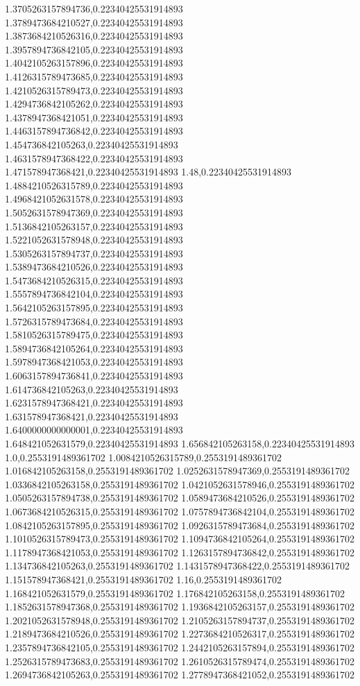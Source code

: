 1.3705263157894736,0.22340425531914893
1.3789473684210527,0.22340425531914893
1.3873684210526316,0.22340425531914893
1.3957894736842105,0.22340425531914893
1.4042105263157896,0.22340425531914893
1.4126315789473685,0.22340425531914893
1.4210526315789473,0.22340425531914893
1.4294736842105262,0.22340425531914893
1.4378947368421051,0.22340425531914893
1.4463157894736842,0.22340425531914893
1.454736842105263,0.22340425531914893
1.4631578947368422,0.22340425531914893
1.471578947368421,0.22340425531914893
1.48,0.22340425531914893
1.4884210526315789,0.22340425531914893
1.4968421052631578,0.22340425531914893
1.5052631578947369,0.22340425531914893
1.5136842105263157,0.22340425531914893
1.5221052631578948,0.22340425531914893
1.5305263157894737,0.22340425531914893
1.5389473684210526,0.22340425531914893
1.5473684210526315,0.22340425531914893
1.5557894736842104,0.22340425531914893
1.5642105263157895,0.22340425531914893
1.5726315789473684,0.22340425531914893
1.5810526315789475,0.22340425531914893
1.5894736842105264,0.22340425531914893
1.5978947368421053,0.22340425531914893
1.6063157894736841,0.22340425531914893
1.614736842105263,0.22340425531914893
1.6231578947368421,0.22340425531914893
1.631578947368421,0.22340425531914893
1.6400000000000001,0.22340425531914893
1.648421052631579,0.22340425531914893
1.656842105263158,0.22340425531914893
1.0,0.2553191489361702
1.0084210526315789,0.2553191489361702
1.016842105263158,0.2553191489361702
1.0252631578947369,0.2553191489361702
1.0336842105263158,0.2553191489361702
1.0421052631578946,0.2553191489361702
1.0505263157894738,0.2553191489361702
1.0589473684210526,0.2553191489361702
1.0673684210526315,0.2553191489361702
1.0757894736842104,0.2553191489361702
1.0842105263157895,0.2553191489361702
1.0926315789473684,0.2553191489361702
1.1010526315789473,0.2553191489361702
1.1094736842105264,0.2553191489361702
1.1178947368421053,0.2553191489361702
1.1263157894736842,0.2553191489361702
1.134736842105263,0.2553191489361702
1.1431578947368422,0.2553191489361702
1.151578947368421,0.2553191489361702
1.16,0.2553191489361702
1.168421052631579,0.2553191489361702
1.176842105263158,0.2553191489361702
1.1852631578947368,0.2553191489361702
1.1936842105263157,0.2553191489361702
1.2021052631578948,0.2553191489361702
1.2105263157894737,0.2553191489361702
1.2189473684210526,0.2553191489361702
1.2273684210526317,0.2553191489361702
1.2357894736842105,0.2553191489361702
1.2442105263157894,0.2553191489361702
1.2526315789473683,0.2553191489361702
1.2610526315789474,0.2553191489361702
1.2694736842105263,0.2553191489361702
1.2778947368421052,0.2553191489361702
